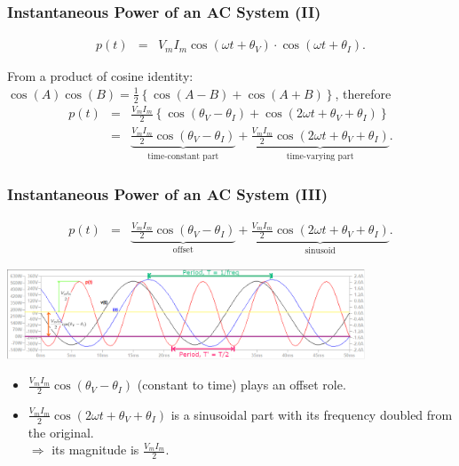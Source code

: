 \documentclass{beamer}
\begin{document}

\begin{frame}[fragile]
\frametitle{Instantaneous Power of an AC System (II)}

\vspace{-1cm}

\begin{eqnarray}
p(t) &=& V_m I_m \cos(\omega t + \theta_V) \cdot \cos(\omega t + \theta_I)
\nonumber .
\end{eqnarray}

From a product of cosine identity: $\cos(A )\cos(B) = \frac{1}{2} \left\{ \cos(A-B) + \cos(A+B) \right\}$, 
therefore\\
\begin{eqnarray}
p(t) &=& \frac{V_m I_m}{2} \left\{ 
\cos(\theta_V - \theta_I)  + \cos(2 \omega t + \theta_V + \theta_I)
\right\}
\nonumber \\
&=& \underbrace{\frac{V_m I_m}{2} \cos(\theta_V - \theta_I)}_{\mbox{time-constant part}} + \underbrace{\frac{V_m I_m}{2} \cos(2 \omega t + \theta_V + \theta_I)}_{\mbox{time-varying part}}
\label{eq: ac instantaneous power} .
\end{eqnarray}

\end{frame}


\begin{frame}[fragile]
\frametitle{Instantaneous Power of an AC System (III)}

\vspace{-1cm}

\begin{eqnarray}
p(t) &=& \underbrace{\frac{V_m I_m}{2} \cos(\theta_V - \theta_I)}_{\mbox{offset}} + \underbrace{\frac{V_m I_m}{2} \cos(2 \omega t + \theta_V + \theta_I)}_{\mbox{sinusoid}}
\nonumber .
\end{eqnarray}
%
\begin{center}
\includegraphics[width=0.8\textwidth]{src/Fig05a.png}
\end{center}

\begin{itemize}
\item $\frac{V_m I_m}{2} \cos(\theta_V - \theta_I)$ (constant to time) plays an offset role.
\item $\frac{V_m I_m}{2} \cos(2 \omega t + \theta_V + \theta_I)$ is a sinusoidal part with its frequency doubled from the original.
\\ $\Rightarrow$ its magnitude is $\frac{V_m I_m}{2}$.
\end{itemize}


\end{frame}
\end{document}
